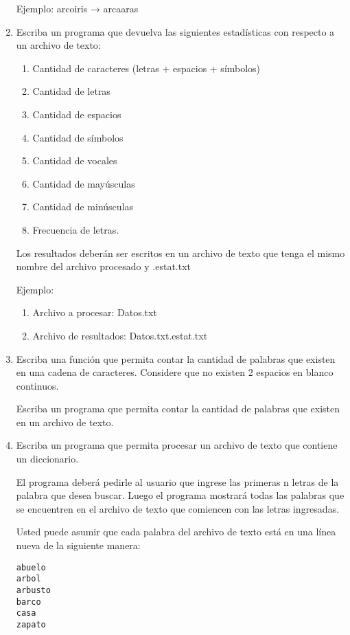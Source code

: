\documentclass{article}
\begin{document}
\begin{enumerate}
	Ejemplo: arcoiris → arcaaras
  \item Escriba un programa que devuelva las siguientes estadísticas con
        respecto a un archivo de texto:
    \begin{enumerate}
      \item Cantidad de caracteres (letras + espacios + símbolos)
      \item Cantidad de letras
      \item Cantidad de espacios
      \item Cantidad de símbolos
      \item Cantidad de vocales
      \item Cantidad de mayúsculas
      \item Cantidad de minúsculas
      \item Frecuencia de letras.
    \end{enumerate}
	Los resultados deberán ser escritos en un archivo de texto que tenga
        el mismo nombre del archivo procesado y .estat.txt

	Ejemplo:

    \begin{enumerate}
      \item Archivo a procesar: Datos.txt
      \item Archivo de resultados: Datos.txt.estat.txt
    \end{enumerate}

  \item Escriba una función que permita contar la cantidad de palabras
        que existen en una cadena de caracteres. Considere que no existen
        2 espacios en blanco continuos.

        Escriba un programa que permita contar la cantidad de palabras
        que existen en un archivo de texto.

  \item Escriba un programa que permita procesar un archivo de texto que
        contiene un diccionario.

        El programa deberá pedirle al usuario que ingrese las primeras n
        letras de la palabra que desea buscar. Luego el programa mostrará
        todas las palabras que se encuentren en el archivo de texto que
        comiencen con las letras ingresadas. 

        Usted puede asumir que cada palabra del archivo de texto está en
        una línea nueva de la siguiente manera:

\begin{lstlisting}
abuelo
arbol
arbusto
barco
casa
zapato
\end{lstlisting}


\end{enumerate}
\end{document}

